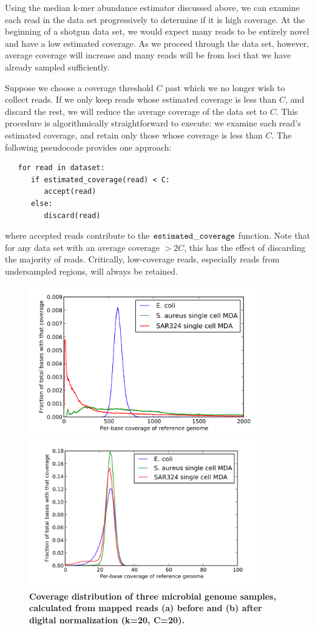 Using the median k-mer abundance estimator discussed above, we can examine each
read in the data set progressively to determine if it is high coverage.  At the
beginning of a shotgun data set, we would expect many reads to be entirely
novel and have a low estimated coverage.  As we proceed through the data set,
however, average coverage will increase and many reads will be from loci that
we have already sampled sufficiently.

Suppose we choose a coverage threshold $C$ past which we no longer wish to
collect reads. If we only keep reads whose estimated coverage is less than $C$,
and discard the rest, we will reduce the average coverage of the data set to
$C$.  This procedure is algorithmically straightforward to execute: we examine
each read's estimated coverage, and retain only those whose coverage is less
than $C$. The following pseudocode provides one approach: 
\begin{verbatim}
   for read in dataset:
      if estimated_coverage(read) < C:
         accept(read)
      else:
         discard(read)
\end{verbatim}
\noindent
\noindent 
where accepted reads contribute to the
$\tt estimated\_coverage$ function.  Note that for any data set with an average
coverage $> 2C$, this has the effect of discarding the majority of reads.
Critically, low-coverage reads, especially reads from undersampled regions,
will always be retained.


\begin{figure}[!ht]
\centerline{\includegraphics[width=4in]{diginorm-coverage2-raw.png}}
\centerline{\includegraphics[width=4in]{diginorm-coverage2-dn.png}}
\caption{
{\bf Coverage distribution of three microbial genome samples, calculated
from mapped reads (a) before and (b) after digital normalization (k=20, C=20).}}
\label{fig:coverage}
\end{figure}


